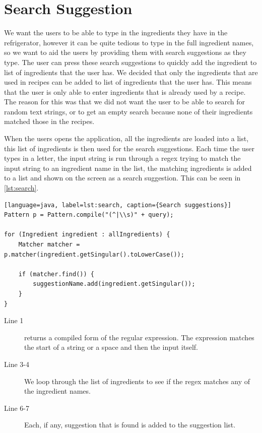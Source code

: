 \section{Search Suggestion}
We want the users to be able to type in the ingredients they have in the refrigerator, however it can be quite tedious to type in the full ingredient names, so we want to aid the users by providing them with search suggestions as they type. The user can press these search suggestions to quickly add the ingredient to list of ingredients that the user has. 
We decided that only the ingredients that are used in recipes can be added to list of ingredients that the user has. This means that the user is only able to enter ingredients that is already used by a recipe. The reason for this was that we did not want the user to be able to search for random text strings, or to get an empty search because none of their ingredients matched those in the recipes. 

When the users opens the application, all the ingredients are loaded into a list, this list of ingredients is then used for the search suggestions. Each time the user types in a letter, the input string is run through a regex trying to match the input string to an ingredient name in the list, the matching ingredients is added to a list and shown on the screen as a search suggestion. This can be seen in \autoref{lst:search}.

\begin{lstlisting}[float][language=java, label=lst:search, caption={Search suggestions}]
Pattern p = Pattern.compile("(^|\\s)" + query);

for (Ingredient ingredient : allIngredients) {
    Matcher matcher = p.matcher(ingredient.getSingular().toLowerCase());

    if (matcher.find()) {
        suggestionName.add(ingredient.getSingular());
    }
}
\end{lstlisting}

\begin{description}
\item[Line 1]  returns a compiled form of the regular expression. The expression matches the start of a string or a space and then the input itself. 
\item[Line 3-4] We loop through the list of ingredients to see if the regex matches any of the ingredient names.
\item[Line 6-7] Each, if any, suggestion that is found is added to the suggestion list.
\end{description}

